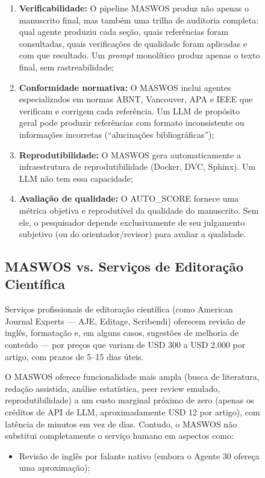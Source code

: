 \begin{figure}
\begin{enumerate}
    \item \textbf{Verificabilidade:} O pipeline MASWOS produz não
    apenas o manuscrito final, mas também uma trilha de auditoria
    completa: qual agente produziu cada seção, quais referências
    foram consultadas, quais verificações de qualidade foram
    aplicadas e com que resultado. Um \textit{prompt} monolítico
    produz apenas o texto final, sem rastreabilidade;

    \item \textbf{Conformidade normativa:} O MASWOS inclui agentes
    especializados em normas ABNT, Vancouver, APA e IEEE que
    verificam e corrigem cada referência. Um LLM de propósito geral
    pode produzir referências com formato inconsistente ou
    informações incorretas (``alucinações bibliográficas'');

    \item \textbf{Reprodutibilidade:} O MASWOS gera automaticamente
    a infraestrutura de reprodutibilidade (Docker, DVC, Sphinx).
    Um LLM não tem essa capacidade;

    \item \textbf{Avaliação de qualidade:} O AUTO\_SCORE fornece
    uma métrica objetiva e reprodutível da qualidade do manuscrito.
    Sem ele, o pesquisador depende exclusivamente de seu julgamento
    subjetivo (ou do orientador/revisor) para avaliar a qualidade.
\end{enumerate}

\subsection{MASWOS vs. Serviços de Editoração Científica}
\label{sec:vs_editoracao}

Serviços profissionais de editoração científica (como American
Journal Experts — AJE, Editage, Scribendi) oferecem revisão de
inglês, formatação e, em alguns casos, sugestões de melhoria
de conteúdo — por preços que variam de USD 300 a USD 2.000 por
artigo, com prazos de 5--15 dias úteis.

O MASWOS oferece funcionalidade mais ampla (busca de literatura,
redação assistida, análise estatística, peer review emulado,
reprodutibilidade) a um custo marginal próximo de zero (apenas os
créditos de API de LLM, aproximadamente USD 12 por artigo),
com latência de minutos em vez de dias. Contudo, o MASWOS não
substitui completamente o serviço humano em aspectos como:

\begin{itemize}
    \item Revisão de inglês por falante nativo (embora o Agente 30
    ofereça uma aproximação);


\end{itemize}
\end{figure}
